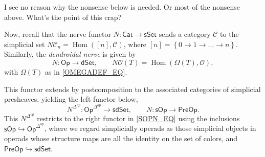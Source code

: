 \documentclass[a4paper,10pt
,draft
]{article}%
\numberwithin{equation}{section}
\numberwithin{figure}{section}
\theoremstyle{definition} %
\newtheorem{remark}[equation]{Remark}%
\newcommand{\set}[1]{\left\{#1\right\}}%
\newcommand{\sSet}{\ensuremath{\mathsf{sSet}}}%
\newcommand{\Cat}{\mathsf{Cat}}
\newcommand{\Op}{\mathsf{Op}}%
\newcommand{\sOp}{\ensuremath{\mathsf{sOp}}}%
\newcommand{\dSet}{\mathsf{dSet}}
\newcommand{\sdSet}{\mathsf{sdSet}}
\newcommand{\PreOp}{\mathsf{PreOp}}
\DeclareMathOperator{\Hom}{Hom}%
\renewcommand{\O}{\ensuremath{\mathcal O}}
\newcommand{\1}{\ensuremath{\mathbbm 1}}%
\begin{document}

{\color{red}I see no reason why the nonsense below is needed.
Or most of the nonsense above. What's the point of this crap?}

{\color{pink} 

Now, recall that the nerve functor
$N \colon \Cat \to \sSet$
sends a category $\mathcal C$ to the simplicial set
$N \mathcal C_n = \Hom([n], \mathcal C)$,
where $[n] = \set{0 \to 1 \to \dots \to n}$.
%
Similarly, the \textit{dendroidal nerve} is given by
\begin{equation}
        \label{OPN_EQ}
        N \colon \Op \to \dSet,
        \qquad
        N\O(T) = \Hom(\Omega(T), \O),
\end{equation}
with $\Omega(T)$ as in \eqref{OMEGADEF_EQ}.

This functor extends by postcomposition to the associated categories of simplicial presheaves,
yielding the left functor below,
\begin{equation}
        \label{SOPN_EQ}
        N^{\Delta^{op}} \colon \Op^{\Delta^{op}} \to \sdSet,
        \qquad
        N \colon \sOp \to \PreOp.
\end{equation}
This $N^{\Delta^{op}}$ restricts to the right functor in \eqref{SOPN_EQ}
using the inclusions
$\sOp \hookrightarrow \Op^{\Delta^{op}}$,
where we regard simplicially operads as those simplicial objects in operads whose
structure maps are all the identity on the set of colors,
and $\mathsf{PreOp} \hookrightarrow \sdSet$.



}
\end{document}
